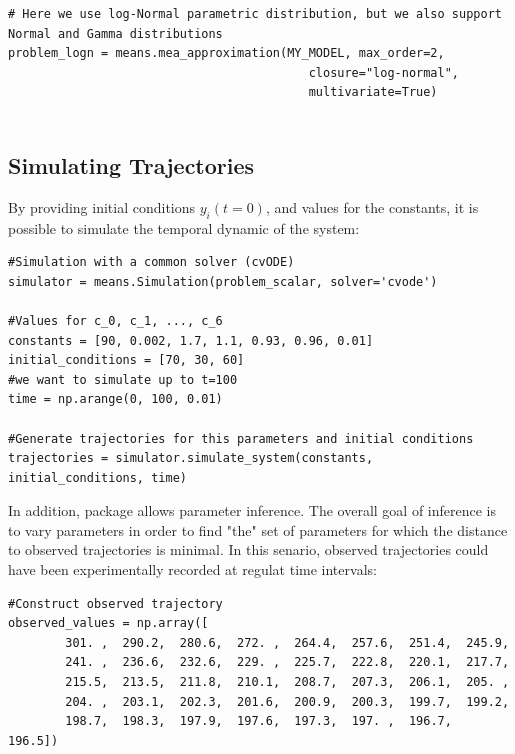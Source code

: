 \begin{framed}
\begin{verbatim}
# Here we use log-Normal parametric distribution, but we also support Normal and Gamma distributions
problem_logn = means.mea_approximation(MY_MODEL, max_order=2,
                                          closure="log-normal",
                                          multivariate=True)
                                          
\end{verbatim}
\end{framed}

\subsection{Simulating Trajectories}
By providing initial conditions $y_i(t=0)$, and values for the constants, it is possible to simulate the temporal dynamic of the system:



\begin{framed}
\begin{verbatim}
#Simulation with a common solver (cvODE)
simulator = means.Simulation(problem_scalar, solver='cvode')

#Values for c_0, c_1, ..., c_6
constants = [90, 0.002, 1.7, 1.1, 0.93, 0.96, 0.01]
initial_conditions = [70, 30, 60]
#we want to simulate up to t=100
time = np.arange(0, 100, 0.01)

#Generate trajectories for this parameters and initial conditions
trajectories = simulator.simulate_system(constants, initial_conditions, time)
\end{verbatim}
\end{framed}

In addition, \means{} package allows parameter inference.
The overall goal of inference is to vary parameters in order to find "the" set of parameters for which the distance to observed trajectories is minimal.
In this senario, observed trajectories could have been experimentally recorded at regulat time intervals:

\begin{framed}
\begin{verbatim}
#Construct observed trajectory
observed_values = np.array([ 
        301. ,  290.2,  280.6,  272. ,  264.4,  257.6,  251.4,  245.9,
        241. ,  236.6,  232.6,  229. ,  225.7,  222.8,  220.1,  217.7,
        215.5,  213.5,  211.8,  210.1,  208.7,  207.3,  206.1,  205. ,
        204. ,  203.1,  202.3,  201.6,  200.9,  200.3,  199.7,  199.2,
        198.7,  198.3,  197.9,  197.6,  197.3,  197. ,  196.7,  196.5])

\end{verbatim}
\end{framed}


